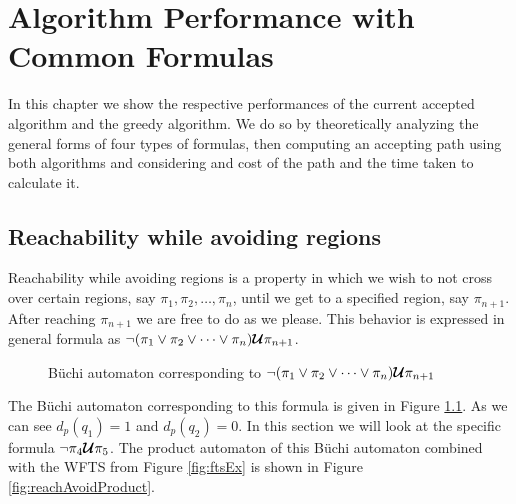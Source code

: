 \chapter{Algorithm Performance with Common Formulas}
In this chapter we show the respective performances of the current accepted algorithm and the greedy algorithm. We do so by theoretically analyzing the general forms of four types of formulas, then computing an accepting path using both algorithms and considering and cost of the path and the time taken to calculate it.


\section{Reachability while avoiding regions} 
Reachability while avoiding regions is a property in which we wish to not cross over certain regions, say $\pi_1, \pi_2, \dots, \pi_n$, until we get to a specified region, say $\pi_{n+1}$. After reaching $\pi_{n+1}$ we are free to do as we please. This behavior is expressed in general formula as $\neg (\pi_1 \lor \pi_2 \lor \dots \lor \pi_n) \bm{\mathcal{U}} \pi_{n+1}$. 

\begin{figure}
\centering
{}
\caption{B\"{u}chi automaton corresponding to $\neg (\pi_1 \lor \pi_2 \lor \dots \lor \pi_n) \bm{\mathcal{U}} \pi_{n+1}$}
\label{fig:ReachAvoid}
\end{figure}

The B\"{u}chi automaton corresponding to this formula is given in Figure \ref{fig:ReachAvoid}. As we can see $d_p(q_1)=1$ and $d_p(q_2)=0$. In this section we will look at the specific formula $\neg \pi_4 \bm{\mathcal{U}} \pi_5$. The product automaton of this B\"{u}chi automaton combined with the WFTS from Figure \ref{fig:ftsEx} is shown in Figure \ref{fig:reachAvoidProduct}.

